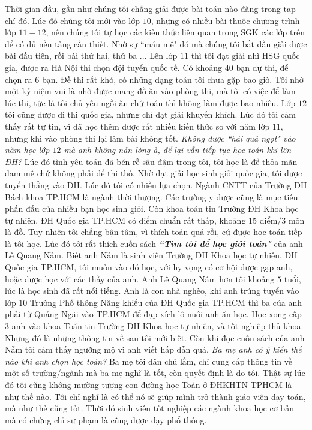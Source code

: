 \begin{multicols}{2}
	\vskip 0.1cm
	Thời gian đầu, gần như chúng tôi chẳng giải được bài toán nào đăng trong tạp chí đó. Lúc đó chúng tôi mới vào lớp $10$, nhưng có nhiều bài thuộc chương trình lớp $11-12$, nên chúng tôi tự học các kiến thức liên quan trong SGK các lớp trên để có đủ nền tảng cần thiết. Nhờ sự ``máu mê" đó mà chúng tôi bắt đầu giải được bài đầu tiên, rồi bài thứ  hai, thứ ba ...
	\vskip 0.1cm 
	Lên lớp $11$ thì tôi đạt giải nhì HSG quốc gia, được ra Hà Nội thi chọn đội tuyển quốc tế. Có khoảng $40$ bạn dự thi, để chọn ra $6$ bạn. Đề thi rất khó, có những dạng toán tôi chưa gặp bao giờ. Tôi nhớ một kỷ niệm vui là nhờ được mang đồ ăn vào phòng thi, mà tôi có việc để làm lúc thi, tức là tôi chủ yếu ngồi ăn chứ toán thì không làm được bao nhiêu.  
	\vskip 0.1cm
	Lớp $12$ tôi cũng được đi thi quốc gia, nhưng chỉ đạt giải khuyến khích. Lúc đó tôi cảm thấy rất tự tin, vì đã học thêm được rất nhiều kiến thức so với năm lớp $11$, nhưng khi vào phòng thi lại làm bài không tốt.  
	\vskip 0.1cm
	\textit{Không được ``hái quả ngọt" vào năm học lớp $12$ mà anh không nản lòng à, để lại vẫn tiếp tục học toán khi lên ĐH?}   
	\vskip 0.1cm
	Lúc đó tình yêu toán đã bén rễ sâu đậm trong tôi, tôi học là để thỏa mãn đam mê chứ không phải để thi thố. 
	\vskip 0.1cm
	Nhờ đạt giải học sinh giỏi quốc gia, tôi được tuyển thẳng vào ĐH. Lúc đó tôi có nhiều lựa chọn. Ngành CNTT của Trường ĐH Bách khoa TP.HCM là ngành thời thượng. Các trường y dược cũng là mục tiêu phấn đấu của nhiều bạn học sinh giỏi. Còn khoa toán tin Trường ĐH Khoa học tự nhiên, ĐH Quốc gia TP.HCM có điểm chuẩn rất thấp, khoảng $15$ điểm/$3$ môn là đỗ. Tuy nhiên tôi chẳng bận tâm, vì thích toán quá rồi, cứ được học toán tiếp là tôi học. 
	\vskip 0.1cm
	Lúc đó tôi rất thích cuốn sách \textbf{\color{diendantoanhoc}\textit{``Tìm tòi để học giỏi toán"}} của anh Lê Quang Nẫm. Biết anh Nẫm là sinh viên Trường ĐH Khoa học tự nhiên, ĐH Quốc gia TP.HCM, tôi muốn vào đó học, với hy vọng có cơ hội được gặp anh, hoặc được học với các thầy của anh. 
	\vskip 0.1cm
	Anh Lê Quang Nẫm hơn tôi khoảng $5$ tuổi, lúc là học sinh đã rất nổi tiếng. Anh là con nhà nghèo, khi anh trúng tuyển vào lớp $10$ Trường Phổ thông Năng khiếu của ĐH Quốc gia TP.HCM thì ba của anh phải từ Quảng Ngãi vào TP.HCM để đạp xích lô nuôi anh ăn học. Học xong cấp $3$ anh vào khoa Toán tin Trường ĐH Khoa học tự nhiên, và tốt nghiệp thủ khoa. Nhưng đó là những thông tin về sau tôi mới biết. Còn khi đọc cuốn sách của anh Nẫm tôi cảm thấy ngưỡng mộ vì anh viết hấp dẫn quá. 
	\vskip 0.1cm
	\textit{Ba mẹ anh có ý kiến thế nào khi anh chọn học toán?}
	\vskip 0.1cm 
	Ba mẹ tôi dân chủ lắm, chỉ cung cấp thông tin về một số trường/ngành mà ba mẹ nghĩ là tốt, còn quyết định là do tôi. Thật sự lúc đó tôi cũng không mường tượng con đường học Toán ở ĐHKHTN TPHCM là như thế nào. Tôi chỉ nghĩ là có thể nó sẽ giúp mình trở thành giáo viên dạy toán, mà như thế cũng tốt. Thời đó sinh viên tốt nghiệp các ngành khoa học cơ bản mà có chứng chỉ sư phạm là cũng được dạy phổ thông. 

\end{multicols}
